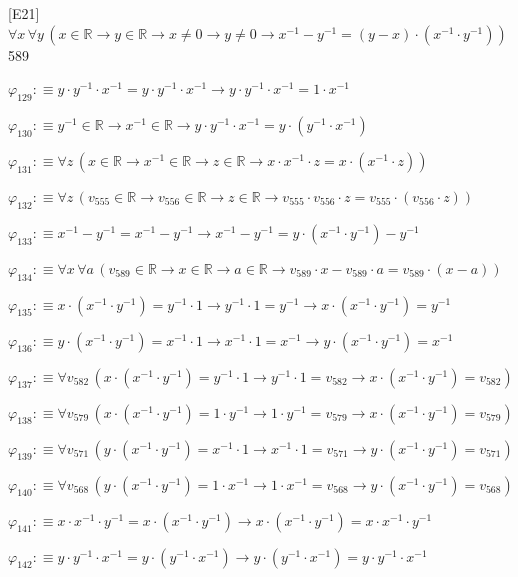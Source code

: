 \begin{fullproof}{[E21]}{$\forall x\,\forall y\,(x \in \mathbb{R} \to y \in \mathbb{R} \to x \neq 0 \to y \neq 0 \to x^{-1} - y^{-1} = (y - x) \cdot (x^{-1} \cdot y^{-1}))$}{589}
\begin{abbrevlist}
\item $\varphi_{129} :\equiv y \cdot y^{-1} \cdot x^{-1} = y \cdot y^{-1} \cdot x^{-1} \to y \cdot y^{-1} \cdot x^{-1} = 1 \cdot x^{-1}$
\item $\varphi_{130} :\equiv y^{-1} \in \mathbb{R} \to x^{-1} \in \mathbb{R} \to y \cdot y^{-1} \cdot x^{-1} = y \cdot (y^{-1} \cdot x^{-1})$
\item $\varphi_{131} :\equiv \forall z\,(x \in \mathbb{R} \to x^{-1} \in \mathbb{R} \to z \in \mathbb{R} \to x \cdot x^{-1} \cdot z = x \cdot (x^{-1} \cdot z))$
\item $\varphi_{132} :\equiv \forall z\,(v_{555} \in \mathbb{R} \to v_{556} \in \mathbb{R} \to z \in \mathbb{R} \to v_{555} \cdot v_{556} \cdot z = v_{555} \cdot (v_{556} \cdot z))$
\item $\varphi_{133} :\equiv x^{-1} - y^{-1} = x^{-1} - y^{-1} \to x^{-1} - y^{-1} = y \cdot (x^{-1} \cdot y^{-1}) - y^{-1}$
\item $\varphi_{134} :\equiv \forall x\,\forall a\,(v_{589} \in \mathbb{R} \to x \in \mathbb{R} \to a \in \mathbb{R} \to v_{589} \cdot x - v_{589} \cdot a = v_{589} \cdot (x - a))$
\item $\varphi_{135} :\equiv x \cdot (x^{-1} \cdot y^{-1}) = y^{-1} \cdot 1 \to y^{-1} \cdot 1 = y^{-1} \to x \cdot (x^{-1} \cdot y^{-1}) = y^{-1}$
\item $\varphi_{136} :\equiv y \cdot (x^{-1} \cdot y^{-1}) = x^{-1} \cdot 1 \to x^{-1} \cdot 1 = x^{-1} \to y \cdot (x^{-1} \cdot y^{-1}) = x^{-1}$
\item $\varphi_{137} :\equiv \forall v_{582}\,(x \cdot (x^{-1} \cdot y^{-1}) = y^{-1} \cdot 1 \to y^{-1} \cdot 1 = v_{582} \to x \cdot (x^{-1} \cdot y^{-1}) = v_{582})$
\item $\varphi_{138} :\equiv \forall v_{579}\,(x \cdot (x^{-1} \cdot y^{-1}) = 1 \cdot y^{-1} \to 1 \cdot y^{-1} = v_{579} \to x \cdot (x^{-1} \cdot y^{-1}) = v_{579})$
\item $\varphi_{139} :\equiv \forall v_{571}\,(y \cdot (x^{-1} \cdot y^{-1}) = x^{-1} \cdot 1 \to x^{-1} \cdot 1 = v_{571} \to y \cdot (x^{-1} \cdot y^{-1}) = v_{571})$
\item $\varphi_{140} :\equiv \forall v_{568}\,(y \cdot (x^{-1} \cdot y^{-1}) = 1 \cdot x^{-1} \to 1 \cdot x^{-1} = v_{568} \to y \cdot (x^{-1} \cdot y^{-1}) = v_{568})$
\item $\varphi_{141} :\equiv x \cdot x^{-1} \cdot y^{-1} = x \cdot (x^{-1} \cdot y^{-1}) \to x \cdot (x^{-1} \cdot y^{-1}) = x \cdot x^{-1} \cdot y^{-1}$
\item $\varphi_{142} :\equiv y \cdot y^{-1} \cdot x^{-1} = y \cdot (y^{-1} \cdot x^{-1}) \to y \cdot (y^{-1} \cdot x^{-1}) = y \cdot y^{-1} \cdot x^{-1}$

\end{abbrevlist}
\end{fullproof}
